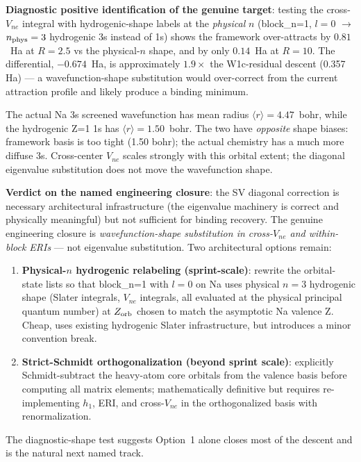 \documentclass[aps,pra,twocolumn,superscriptaddress,longbibliography]{revtex4-2}
\begin{document}
\textbf{Diagnostic positive identification of the genuine target}: testing the
cross-$V_{ne}$ integral with hydrogenic-shape labels at the
\emph{physical} $n$ (block\_n=1, $l=0$ $\to$ $n_{\rm phys}=3$ hydrogenic 3s
instead of 1s) shows the framework over-attracts by $0.81$~Ha at
$R = 2.5$ vs the physical-$n$ shape, and by only $0.14$~Ha at
$R = 10$. The differential, $-0.674$~Ha, is approximately
$1.9\times$ the W1c-residual descent (0.357 Ha) --- a
wavefunction-shape substitution would over-correct from the
current attraction profile and likely produce a binding minimum.

The actual Na 3s screened wavefunction has mean radius
$\langle r \rangle = 4.47$~bohr, while the hydrogenic Z=1 1s has
$\langle r \rangle = 1.50$~bohr. The two have \emph{opposite} shape
biases: framework basis is too tight (1.50 bohr); the actual
chemistry has a much more diffuse 3s. Cross-center $V_{ne}$ scales
strongly with this orbital extent; the diagonal eigenvalue
substitution does not move the wavefunction shape.

\textbf{Verdict on the named engineering closure}: the SV diagonal
correction is necessary architectural infrastructure (the eigenvalue
machinery is correct and physically meaningful) but not sufficient
for binding recovery. The genuine engineering closure is
\emph{wavefunction-shape substitution in cross-$V_{ne}$ and
within-block ERIs} --- not eigenvalue substitution. Two architectural
options remain:
\begin{enumerate}
  \item \textbf{Physical-$n$ hydrogenic relabeling (sprint-scale)}:
    rewrite the orbital-state lists so that block\_n=1 with $l=0$ on
    Na uses physical $n=3$ hydrogenic shape (Slater integrals,
    $V_{ne}$ integrals, all evaluated at the physical principal
    quantum number) at $Z_{\rm orb}$ chosen to match the asymptotic
    Na valence Z. Cheap, uses existing hydrogenic Slater
    infrastructure, but introduces a minor convention break.
  \item \textbf{Strict-Schmidt orthogonalization (beyond sprint scale)}:
    explicitly Schmidt-subtract the heavy-atom core orbitals from the
    valence basis before computing all matrix elements; mathematically
    definitive but requires re-implementing $h_1$, ERI, and cross-$V_{ne}$
    in the orthogonalized basis with renormalization.
\end{enumerate}
The diagnostic-shape test suggests Option~1 alone closes most of the
descent and is the natural next named track.
\end{document}
